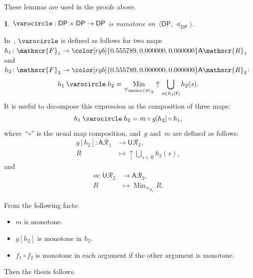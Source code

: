 \documentclass[twocolumn,english]{IEEEconf}
\theoremstyle{plain}
\theoremstyle{definition}
\theoremstyle{definition}
\theoremstyle{plain}
\newtheorem{lem}[thm]{\protect\lemmaname}
\newcommand{\aword}[1]{\mathsf{#1}}
\newcommand{\vmath}[1]{\aword{#1}}
\DeclareMathOperator*{\Min}{Min}
\newcommand{\posleq}{\preceq}
\newcommand{\antichains}{\vmath{A}}
\newcommand{\upsets}{\vmath{U}}
\newcommand{\ftor}{{h}}
\newcommand{\funsp}{\mathscr{F}}
\newcommand{\fun}{\vmath{f}}
\newcommand{\ressp}{\mathscr{R}}
\newcommand{\Aressp}{{\antichains\ressp}}
\newcommand{\dpsp}{\vmath{DP}}
\newcommand{\dpleq}{\posleq_\dpsp}
\newcommand{\opseries}{\mathbin{\varocircle}}
\newcommand{\colR}{\color[rgb]{0.555789,0.000000,0.000000}}
\renewcommand{\Aressp}{{\colR\antichains\ressp}}
\providecommand{\lemmaname}{Lemma}
\begin{document}
These lemmas are used in the proofs above.
\begin{lem}
\label{lem:series-monotone}$\opseries:\dpsp\times\dpsp\rightarrow\dpsp$
is monotone on~$\langle\dpsp,\dpleq\rangle$.
\end{lem}
\begin{IEEEproof}
In~, $\opseries$ is defined as follows
for two maps~$\ftor_{1}\colon\funsp_{1}\rightarrow\Aressp_{1}$ and~$\ftor_{2}\colon\funsp_{2}\rightarrow\Aressp_{2}$:
\[
{\displaystyle \ftor_{1}\opseries\ftor_{2}=\Min_{\posleq_{\ressp_{2}}}\uparrow\bigcup_{s\in\ftor_{1}(\fun)}\ftor_{2}(s)}.
\]
It is useful to decompose this expression as the composition of three
maps:
\[
\ftor_{1}\opseries\ftor_{2}=m\circ g[\ftor_{2}]\circ\ftor_{1},
\]
where~``$\circ$'' is the usual map composition, and~$g$ and~$m$
are defined as follows: 
\begin{align*}
g[\ftor_{2}]:\antichains\ressp_{1} & \rightarrow\upsets\ressp_{2},\\
R & \mapsto\uparrow\bigcup_{s\in R}\ftor_{2}(s),
\end{align*}
and 
\begin{align*}
m:\upsets\ressp_{2} & \rightarrow\antichains\ressp_{2},\\
R & \mapsto\Min_{\posleq_{\ressp_{2}}}R.
\end{align*}

From the following facts:
\begin{itemize}
\item $m$ is monotone.
\item $g[\ftor_{2}]$ is monotone in $\ftor_{2}$.
\item $f_{1}\circ f_{2}$ is monotone in each argument if the other argument
is monotone.
\end{itemize}
Then the thesis follows.
\end{IEEEproof}
\end{document}
